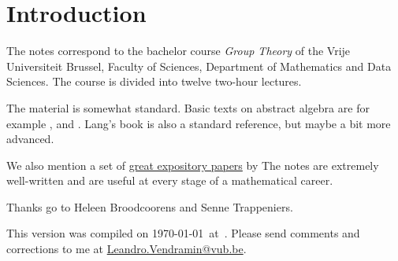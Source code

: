 \section*{Introduction}

The notes correspond to the bachelor 
course \emph{Group Theory} of the 
Vrije Universiteit Brussel, 
Faculty of Sciences, 
Department of Mathematics and Data Sciences. The course
is divided into twelve two-hour lectures. 

The material is somewhat standard. Basic texts on abstract algebra
are for example \cite{MR1129886}, \cite{MR2286236} and \cite{MR600654}. 
Lang's book \cite{MR783636} is also a standard reference, but 
maybe a bit more advanced. 

We also mention a set of 
\href{https://kconrad.math.uconn.edu/blurbs/}{great expository papers} by 
The notes are extremely well-written and are useful at  
every stage of a mathematical career. 


 Thanks go to Heleen Broodcoorens and 
 Senne Trappeniers. 

This version 
was compiled on \today~at~\currenttime. 
Please send comments and corrections to me at \url{Leandro.Vendramin@vub.be}. 


